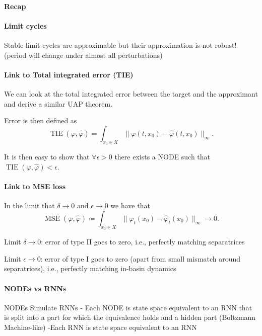 \documentclass{article}
\theoremstyle{definition}
\theoremstyle{remark}
\newcounter{ct}
\begin{document}
\paragraph{Recap}	


\paragraph{Limit cycles}
Stable limit cycles are approximable but their approximation is not robust! (period will change under almost all perturbations)


\paragraph{Link to Total integrated error (TIE)}
We can look at the total integrated error between the target and the approximant and derive a similar UAP theorem.

Error is then defined as 
\begin{equation}
\operatorname{TIE}(\varphi, \hat{\varphi}) = \int_{x_0\in X}\|\varphi(t,x_0) - \hat{\varphi}(t, x_0)\|_\infty.
\end{equation}

It is then easy to show that $\forall\epsilon>0$ there exists a NODE such that $\operatorname{TIE}(\varphi, \hat{\varphi})<\epsilon$.

\paragraph{Link to MSE loss}
In the limit that $\delta\rightarrow 0$ and $\epsilon\rightarrow 0$  we have that 
\[\operatorname{MSE}(\varphi, \hat{\varphi}) \coloneqq \int_{x_0\in X} \|\varphi_t(x_0) - \hat{\varphi}_t(x_0)\|_\infty \rightarrow 0.\]


Limit $\delta\rightarrow 0$: error of type II goes to zero, i.e., perfectly matching separatrices


Limit $\epsilon\rightarrow 0$: error of type I goes to zero (apart from small mismatch around separatrices), i.e., perfectly matching in-basin dynamics


\paragraph{NODEs vs RNNs}
NODEs Simulate RNNs 
- Each NODE is state space equivalent to an RNN that is split into a part for which the equivalence holds and a hidden part (Boltzmann Machine-like)
-Each RNN is state space equivalent to an RNN
\end{document}
